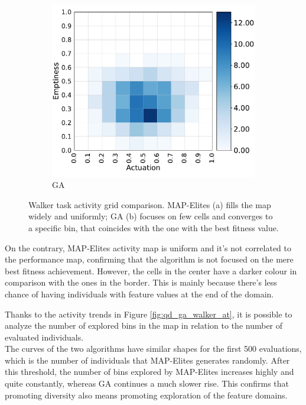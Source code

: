 \begin{figure}[H]
\begin{subfigure}[b]{0.49\textwidth}
         \includegraphics[scale=0.45]{images/body_opt/walker_ga_ag}
         \caption{GA}
    \end{subfigure}
    \caption{Walker task activity grid comparison. MAP-Elites (a) fills the map widely and uniformly; GA (b) focuses on few cells and converges to a specific bin, that coincides with the one with the best fitness value.}
    \label{fig:qd_ga_walker_ag}
\end{figure}

On the contrary, MAP-Elites activity map is uniform and it's not correlated to the performance map, confirming that the algorithm is not focused on the mere best fitness achievement. However, the cells in the center have a darker colour in comparison with the ones in the border. This is mainly because there's less chance of having individuals with feature values at the end of the domain.

Thanks to the activity trends in Figure \ref{fig:qd_ga_walker_at}, it is possible to analyze the number of explored bins in the map in relation to the number of evaluated individuals.\\
The curves of the two algorithms have similar shapes for the first 500 evaluations, which is the number of individuals that MAP-Elites generates randomly. After this threshold, the number of bins explored by MAP-Elites increases highly and quite constantly, whereas GA continues a much slower rise.
This confirms that promoting diversity also means promoting exploration of the feature domains.

